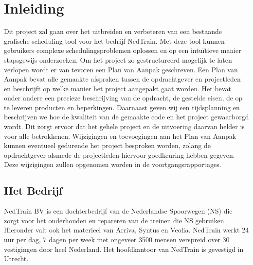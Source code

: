\section{Inleiding}
Dit project zal gaan over het uitbreiden en verbeteren van een bestaande grafische scheduling-tool voor het bedrijf NedTrain. Met deze tool kunnen gebruikers complexe schedulingsproblemen oplossen en op een intu\"itieve manier stapsgewijs onderzoeken. Om het project zo gestructureerd mogelijk te laten verlopen wordt er van tevoren een Plan van Aanpak geschreven. Een Plan van Aanpak bevat alle gemaakte afspraken tussen de opdrachtgever en projectleden en beschrijft op welke manier het project aangepakt gaat worden. Het bevat onder andere een precieze beschrijving van de opdracht, de gestelde eisen, de op te leveren producten en beperkingen. Daarnaast geven wij een tijdsplanning en beschrijven we hoe de kwaliteit van de gemaakte code en het project gewaarborgd wordt. Dit zorgt ervoor dat het gehele project en de uitvoering daarvan helder is voor alle betrokkenen. Wijzigingen en toevoegingen aan het Plan van Aanpak kunnen eventueel gedurende het project besproken worden, zolang de opdrachtgever alsmede de projectleden hiervoor goedkeuring hebben gegeven. Deze wijzigingen zullen opgenomen worden in de voortgangsrapportages.

\subsection{Het Bedrijf}
NedTrain BV is een dochterbedrijf van de Nederlandse Spoorwegen (NS) die zorgt voor het onderhouden en repareren van de treinen die NS gebruiken. Hieronder valt ook het materieel van Arriva, Syntus en Veolia. NedTrain werkt 24 uur per dag, 7 dagen per week met ongeveer 3500 mensen verspreid over 30 vestigingen door heel Nederland. Het hoofdkantoor van NedTrain is gevestigd in Utrecht. 

